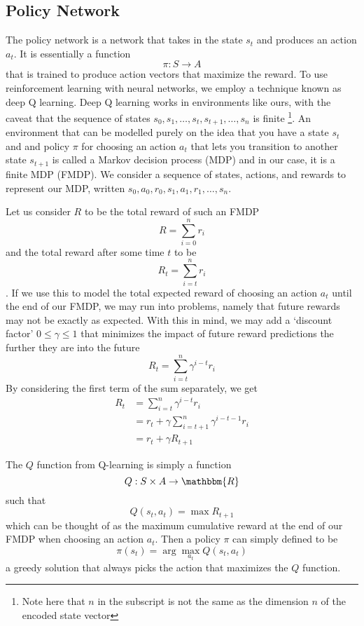 \documentclass[conference, 12pt]{IEEEtran} %
\begin{document}
	\subsection{Policy Network}
	\par The policy network is a network that takes in the state $s_t$ and produces an action $a_t$. It is essentially a function
	$$
	\pi: S \to A
	$$
	that is trained to produce action vectors that maximize the reward. To use reinforcement learning with neural networks, we employ a technique known as deep Q learning. Deep Q learning works in environments like ours, with the caveat that the sequence of states $s_0, s_1, \dots, s_t, s_{t+1}, \dots, s_n$ is finite \footnote{Note here that $n$ in the subscript is not the same as the dimension $n$ of the encoded state vector}. An environment that can be modelled purely on the idea that you have a state $s_t$ and and policy $\pi$ for choosing an action $a_t$ that lets you transition to another state $s_{t+1}$ is called a Markov decision process (MDP) and in our case, it is a finite MDP (FMDP). We consider a sequence of states, actions, and rewards to represent our MDP, written $s_0,a_0,r_0,s_1,a_1,r_1,\dots,s_n$.
	\par Let us consider $R$ to be the total reward of such an FMDP
	$$
	R = \sum_{i=0}^n r_i
	$$
	and the total reward after some time $t$ to be
	$$
	R_t = \sum_{i=t}^n r_i
	$$.
	If we use this to model the total expected reward of choosing an action $a_t$ until the end of our FMDP, we may run into problems, namely that future rewards may not be exactly as expected. With this in mind, we may add a `discount factor' $0 \leq \gamma \leq 1$ that minimizes the impact of future reward predictions the further they are into the future
	$$
	R_t = \sum_{i=t}^n \gamma ^{i-t} r_i
	$$
	By considering the first term of the sum separately, we get
	\begin{align*}
	R_t &=  \sum_{i=t}^n \gamma ^{i-t} r_i \\
	&= r_t + \gamma  \sum_{i=t+1}^n \gamma ^{i-t-1} r_i \\
	&= r_t + \gamma R_{t+1}
	\end{align*}
	\par The $Q$ function from Q-learning is simply a function
	$$
	Q : S \times A \to \mathbbm{R}
	$$
	such that
	$$Q(s_t, a_t) = \max R_{t+1}$$
	which can be thought of as the maximum cumulative reward at the end of our FMDP when choosing an action $a_t$. Then a policy $\pi$ can simply defined to be
	$$
	\pi(s_t) = \arg \max_{a_t} Q(s_t, a_t)
	$$
	a greedy solution that always picks the action that maximizes the $Q$ function.
\end{document}
